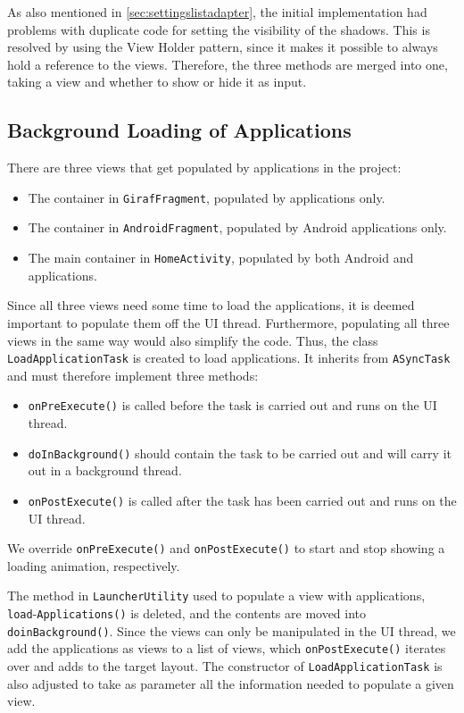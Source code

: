 As also mentioned in \cref{sec:settingslistadapter}, the initial implementation had problems with duplicate code for setting the visibility of the shadows.
This is resolved by using the View Holder pattern, since it makes it possible to always hold a reference to the views. 
Therefore, the three methods are merged into one, taking a view and whether to show or hide it as input.

\subsection{Background Loading of Applications}\label{sec:sprint4:dev:loadapplicationtask}
There are three views that get populated by applications in the \launcher project:

\begin{itemize}
\item The container in \lstinline!GirafFragment!, populated by \giraf applications only.
\item The container in \lstinline!AndroidFragment!, populated by Android applications only.
\item The main container in \lstinline!HomeActivity!, populated by both Android and \giraf applications.
\end{itemize}

Since all three views need some time to load the applications, it is deemed important to populate them off the UI thread.
Furthermore, populating all three views in the same way would also simplify the code.
Thus, the class \lstinline!LoadApplicationTask! is created to load applications. 
It inherits from \lstinline!ASyncTask! and must therefore implement three methods:

\begin{itemize}
\item \lstinline!onPreExecute()! is called before the task is carried out and runs on the UI thread.
\item \lstinline!doInBackground()! should contain the task to be carried out and will carry it out in a background thread.
\item \lstinline!onPostExecute()! is called after the task has been carried out and runs on the UI thread.
\end{itemize}

We override \lstinline!onPreExecute()! and \lstinline!onPostExecute()! to start and stop showing a loading animation, respectively.

The method in \lstinline!LauncherUtility! used to populate a view with applications, \lstinline!load!-\lstinline!Applications()! is deleted, and the contents are moved into \lstinline!doinBackground()!.
Since the views can only be manipulated in the UI thread, we add the applications as views to a list of views, which \lstinline!onPostExecute()! iterates over and adds to the target layout. 
The constructor of \lstinline!LoadApplicationTask! is also adjusted to take as parameter all the information needed to populate a given view.

